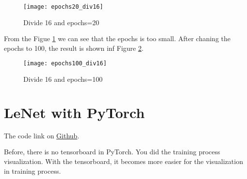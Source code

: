 \begin{figure}[!ht]
  \centering
  \texttt{[image: epochs20\_div16]}
  \caption{Divide 16 and epochs=20}
  \label{fig:div16-epochs20}
\end{figure}


From the Figue \ref{fig:div16-epochs20} we can see that the epochs is too small.
After chaning the epochs to 100, the result is shown inf Figure \ref{fig:div16-epochs100}.
\begin{figure}[!ht]
  \centering
  \texttt{[image: epochs100\_div16]}
  \caption{Divide 16 and epochs=100}
  \label{fig:div16-epochs100}
\end{figure}


\section{LeNet with PyTorch}
\label{sec:lenet-with-pytorch}

The code link on \href{https://github.com/mingmingli916/dl_classification}{Github}.

Before, there is no tensorboard in PyTorch. You did the training process visualization.
With the tensorboard, it becomes more easier for the visualization in training process.



